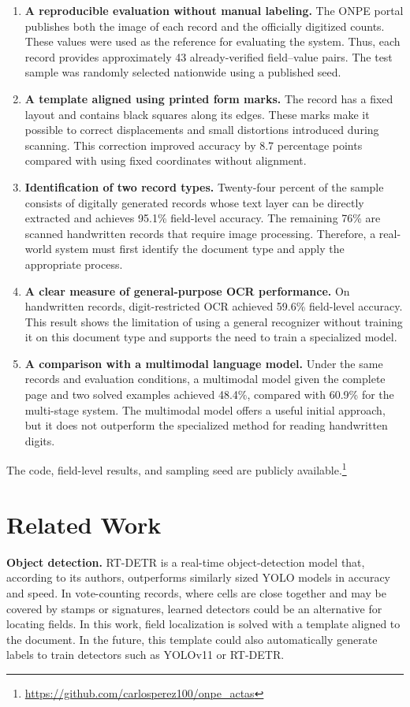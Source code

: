 \documentclass[conference]{IEEEtran}
\begin{document}
\begin{enumerate}
\item \textbf{A reproducible evaluation without manual labeling.} The ONPE portal
publishes both the image of each record and the officially digitized counts.
These values were used as the reference for evaluating the system. Thus, each
record provides approximately 43 already-verified field--value pairs. The test
sample was randomly selected nationwide using a published seed.

\item \textbf{A template aligned using printed form marks.} The record has a
fixed layout and contains black squares along its edges. These marks make it
possible to correct displacements and small distortions introduced during
scanning. This correction improved accuracy by 8.7 percentage points compared
with using fixed coordinates without alignment.

\item \textbf{Identification of two record types.} Twenty-four percent of the
sample consists of digitally generated records whose text layer can be directly
extracted and achieves 95.1\% field-level accuracy. The remaining 76\% are
scanned handwritten records that require image processing. Therefore, a
real-world system must first identify the document type and apply the appropriate
process.

\item \textbf{A clear measure of general-purpose OCR performance.} On handwritten
records, digit-restricted OCR achieved 59.6\% field-level accuracy. This result
shows the limitation of using a general recognizer without training it on this
document type and supports the need to train a specialized model.

\item \textbf{A comparison with a multimodal language model.} Under the same
records and evaluation conditions, a multimodal model given the complete page
and two solved examples achieved 48.4\%, compared with 60.9\% for the multi-stage
system. The multimodal model offers a useful initial approach, but it does not
outperform the specialized method for reading handwritten digits.
\end{enumerate}

The code, field-level results, and sampling seed are publicly
available.\footnote{\url{https://github.com/carlosperez100/onpe_actas}}

\section{Related Work}
\textbf{Object detection.} RT-DETR \cite{rtdetr} is a real-time object-detection
model that, according to its authors, outperforms similarly sized YOLO models in
accuracy and speed. In vote-counting records, where cells are close together and
may be covered by stamps or signatures, learned detectors could be an alternative
for locating fields. In this work, field localization is solved with a template
aligned to the document. In the future, this template could also automatically
generate labels to train detectors such as YOLOv11 or RT-DETR.
\end{document}
